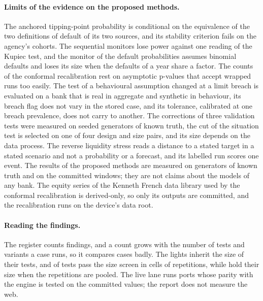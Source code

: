 \paragraph{Limits of the evidence on the proposed methods.} The anchored tipping-point probability is conditional on the equivalence of the two definitions of default of its two sources, and its stability criterion fails on the agency's cohorts. The sequential monitors lose power against one reading of the Kupiec test, and the monitor of the default probabilities assumes binomial defaults and loses its size when the defaults of a year share a factor. The counts of the conformal recalibration rest on asymptotic p-values that accept wrapped runs too easily. The test of a behavioural assumption changed at a limit breach is evaluated on a bank that is real in aggregate and synthetic in behaviour, its breach flag does not vary in the stored case, and its tolerance, calibrated at one breach prevalence, does not carry to another. The corrections of three validation tests were measured on seeded generators of known truth, the cut of the situation test is selected on one of four design and size pairs, and its size depends on the data process. The reverse liquidity stress reads a distance to a stated target in a stated scenario and not a probability or a forecast, and its labelled run scores one event. The results of the proposed methods are measured on generators of known truth and on the committed windows; they are not claims about the models of any bank. The equity series of the Kenneth French data library used by the conformal recalibration is derived-only, so only its outputs are committed, and the recalibration runs on the device's data root.

\paragraph{Reading the findings.} The register counts findings, and a count grows with the number of tests and variants a case runs, so it compares cases badly. The lights inherit the size of their tests, and \rsCTwentyTwoWithin{} of \pxOneTests{} tests pass the size screen in cells of \rsCTwentyTwoNullPerTest{} repetitions, while \pxPpOneHold{} hold their size when the repetitions are pooled. The live lane runs ports whose parity with the engine is tested on the committed values; the report does not measure the web.
